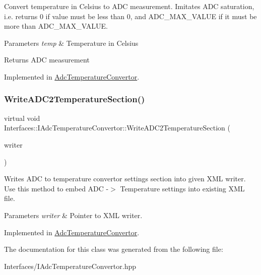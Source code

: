 Convert temperature in Celsius to A\+DC measurement. Imitates A\+DC saturation, i.\+e. returns 0 if value must be less than 0, and A\+D\+C\+\_\+\+M\+A\+X\+\_\+\+V\+A\+L\+UE if it must be more than A\+D\+C\+\_\+\+M\+A\+X\+\_\+\+V\+A\+L\+UE. 


\begin{DoxyParams}{Parameters}
{\em temp} & Temperature in Celsius \\
\hline
\end{DoxyParams}
\begin{DoxyReturn}{Returns}
A\+DC measurement 
\end{DoxyReturn}


Implemented in \hyperlink{class_adc_temperature_convertor_ae82f374826a431c837bdf796c593775b}{Adc\+Temperature\+Convertor}.

\mbox{\label{class_interfaces_1_1_i_adc_temperature_convertor_abc7ed5fdfeaed255af14930431b46ac1}} 
\subsubsection{\texorpdfstring{Write\+A\+D\+C2\+Temperature\+Section()}{WriteADC2TemperatureSection()}}
{\footnotesize\ttfamily virtual void Interfaces\+::\+I\+Adc\+Temperature\+Convertor\+::\+Write\+A\+D\+C2\+Temperature\+Section (\begin{DoxyParamCaption}\item[{Q\+Xml\+Stream\+Writer $\ast$}]{writer }\end{DoxyParamCaption})\hspace{0.3cm}{\ttfamily [pure virtual]}}



Writes A\+DC to temperature convertor settings section into given X\+ML writer. Use this method to embed A\+DC -\/$>$ Temperature settings into existing X\+ML file. 


\begin{DoxyParams}{Parameters}
{\em writer} & Pointer to X\+ML writer. \\
\hline
\end{DoxyParams}


Implemented in \hyperlink{class_adc_temperature_convertor_aa06c19d0ac9f45d6f2f67718eda042ac}{Adc\+Temperature\+Convertor}.



The documentation for this class was generated from the following file\+:\begin{DoxyCompactItemize}
\item 
Interfaces/I\+Adc\+Temperature\+Convertor.\+hpp\end{DoxyCompactItemize}
